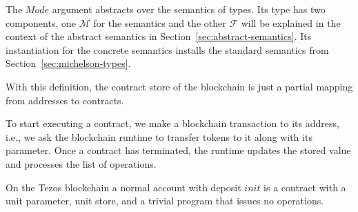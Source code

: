 The $Mode$ argument abstracts over the semantics of types. Its type
has two components, one $\mathcal{M}$ for the semantics and the other $\mathcal{F}$ will be
explained in the context of the abstract semantics in Section~\ref{sec:abstract-semantics}.
\ConcreteMODE
Its instantiation for the concrete semantics installs the 
standard semantics from Section~\ref{sec:michelson-types}.
\ConcreteCMode

With this definition, the contract store of the blockchain is just a partial mapping from addresses
to contracts.
\ConcreteBlockchain

To start executing a contract, we make a blockchain transaction to its
address, i.e., we ask the blockchain runtime to transfer tokens to it along with its parameter.
Once a contract has terminated, the runtime updates the
stored value and processes the list of operations.

On the Tezos blockchain a normal account with deposit $init$ is a
contract with a unit parameter, unit store, and a trivial program that issues no operations.
\ConcreteAccount



